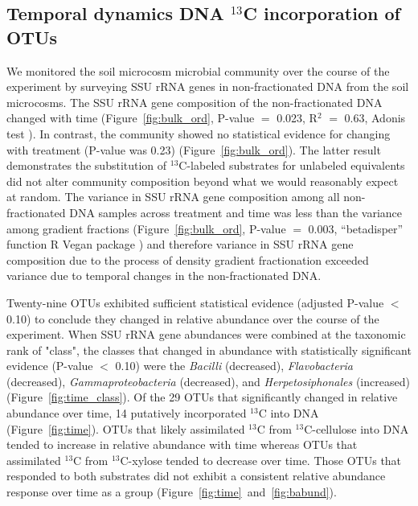 \subsection{Temporal dynamics DNA $^{13}$C incorporation of OTUs}
We monitored the soil microcosm microbial community over the course of the
experiment by surveying SSU rRNA genes in non-fractionated DNA from the soil
microcosms. The SSU rRNA gene composition of the non-fractionated DNA changed
with time (Figure~\ref{fig:bulk_ord}, P-value $=$ 0.023, R$^{2}$ $=$ 0.63,
Adonis test \citep{Anderson2001a}). In contrast, the community showed no
statistical evidence for changing with treatment (P-value was 0.23)
(Figure~\ref{fig:bulk_ord}). The latter result demonstrates the substitution of
$^{13}$C-labeled substrates for unlabeled equivalents did not alter community
composition beyond what we would reasonably expect at random. The variance in
SSU rRNA gene composition among all non-fractionated DNA samples across
treatment and time was less than the variance among gradient fractions
(Figure~\ref{fig:bulk_ord}, P-value $=$ 0.003, “betadisper” function R Vegan
package \citep{oksanen2007vegan}) and therefore variance in SSU rRNA gene
composition due to the process of density gradient fractionation exceeded
variance due to temporal changes in the non-fractionated DNA.

Twenty-nine OTUs exhibited sufficient statistical evidence (adjusted P-value
$<$ 0.10) to conclude they changed in relative abundance over the
course of the experiment. When SSU rRNA gene abundances were combined at
the taxonomic rank of "class", the classes that changed in abundance with
statistically significant evidence (P-value $<$ 0.10) were the
\textit{Bacilli} (decreased), \textit{Flavobacteria} (decreased),
\textit{Gammaproteobacteria} (decreased), and \textit{Herpetosiphonales}
(increased) (Figure~\ref{fig:time_class}). Of the 29 OTUs that
significantly changed in relative abundance over time, 14 putatively
incorporated $^{13}$C into DNA (Figure~\ref{fig:time}). OTUs that likely
assimilated $^{13}$C from $^{13}$C-cellulose into DNA tended to increase in
relative abundance with time whereas OTUs that assimilated $^{13}$C from
$^{13}$C-xylose tended to decrease over time. Those OTUs that responded to both
substrates did not exhibit a consistent relative abundance response over time
as a group (Figure~\ref{fig:time}~and~\ref{fig:babund}).

